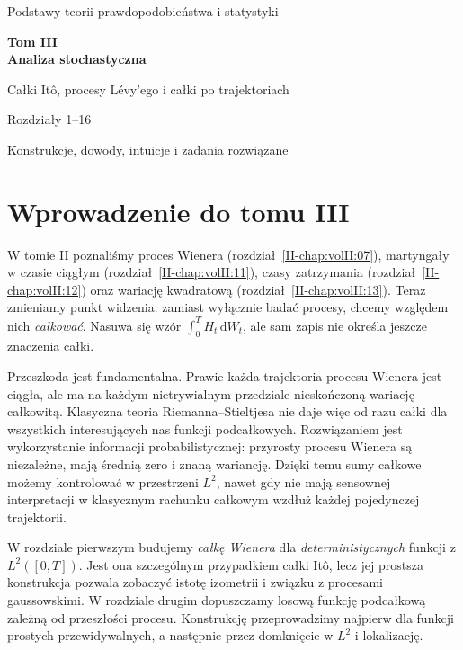 \documentclass[11pt,a4paper,oneside]{report}
\numberwithin{equation}{chapter}
\theoremstyle{plain}
\theoremstyle{definition}
\theoremstyle{remark}
\newcommand{\dd}{\mathrm{d}}
\begin{document}
\hypersetup{pageanchor=false}
\begin{titlepage}
\centering\vspace*{3.4cm}
{\Large Podstawy teorii prawdopodobieństwa i statystyki\par}
\vspace{1.2cm}
{\Huge\bfseries Tom III\\[0.25cm] Analiza stochastyczna\par}
\vspace{0.9cm}
{\LARGE Całki Itô, procesy Lévy'ego i całki po trajektoriach\par}
\vspace{0.7cm}
{\Large Rozdziały 1--16\par}
\vfill
{\large Konstrukcje, dowody, intuicje i zadania rozwiązane\par}
\vspace{1.1cm}
\end{titlepage}
\hypersetup{pageanchor=true}
\tableofcontents
\chapter*{Wprowadzenie do tomu III}
W tomie II poznaliśmy proces Wienera (rozdział~\ref{II-chap:volII:07}),
martyngały w czasie ciągłym (rozdział~\ref{II-chap:volII:11}),
czasy zatrzymania (rozdział~\ref{II-chap:volII:12})
oraz wariację kwadratową (rozdział~\ref{II-chap:volII:13}). Teraz zmieniamy punkt
widzenia: zamiast wyłącznie badać procesy, chcemy względem nich
\emph{całkować}. Nasuwa się wzór $\int_0^T H_t\,\dd W_t$, ale
sam zapis nie określa jeszcze znaczenia całki.

Przeszkoda jest fundamentalna. Prawie każda trajektoria procesu Wienera
jest ciągła, ale ma na każdym nietrywialnym przedziale nieskończoną
wariację całkowitą. Klasyczna teoria Riemanna--Stieltjesa nie daje więc
od razu całki dla wszystkich interesujących nas funkcji podcałkowych.
Rozwiązaniem jest wykorzystanie informacji probabilistycznej:
przyrosty procesu Wienera są niezależne, mają średnią zero i znaną
wariancję. Dzięki temu sumy całkowe możemy kontrolować w przestrzeni
$L^2$, nawet gdy nie mają sensownej interpretacji w klasycznym
rachunku całkowym wzdłuż każdej pojedynczej trajektorii.

W rozdziale pierwszym budujemy \emph{całkę Wienera} dla
\emph{deterministycznych} funkcji z $L^2([0,T])$. Jest ona szczególnym
przypadkiem całki Itô, lecz jej prostsza konstrukcja pozwala zobaczyć
istotę izometrii i związku z procesami gaussowskimi. W rozdziale
drugim dopuszczamy losową funkcję podcałkową zależną od przeszłości
procesu. Konstrukcję przeprowadzimy najpierw dla funkcji prostych
przewidywalnych, a następnie przez domknięcie w $L^2$ i lokalizację.
\end{document}
